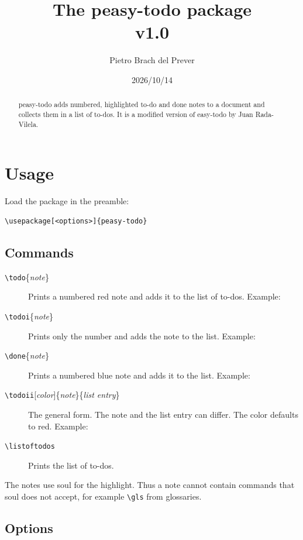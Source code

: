 \documentclass{article}
\title{The \textsf{peasy-todo} package\\\large v1.0}
\author{Pietro Brach del Prever}
\date{2026/10/14}
\newcommand{\cs}[1]{\texttt{\textbackslash#1}}
\begin{document}
\maketitle

\begin{abstract}
  \textsf{peasy-todo} adds numbered, highlighted to-do and done notes to a document
  and collects them in a list of to-dos. It is a modified version of
  \textsf{easy-todo} by Juan Rada-Vilela.
\end{abstract}

\listoftodos

\section{Usage}

Load the package in the preamble:
\begin{verbatim}
\usepackage[<options>]{peasy-todo}
\end{verbatim}

\subsection{Commands}

\begin{description}
  \item[\cs{todo}\{\textit{note}\}] Prints a numbered red note and adds it to the
    list of to-dos. Example: 
  \item[\cs{todoi}\{\textit{note}\}] Prints only the number and adds the note to the
    list. Example: 
  \item[\cs{done}\{\textit{note}\}] Prints a numbered blue note and adds it to the
    list. Example: 
  \item[\cs{todoii}{[\textit{color}]}\{\textit{note}\}\{\textit{list entry}\}] The
    general form. The note and the list entry can differ. The color defaults to red.
    Example: 
  \item[\cs{listoftodos}] Prints the list of to-dos.
\end{description}

The notes use \textsf{soul} for the highlight. Thus a note cannot contain commands
that \textsf{soul} does not accept, for example \cs{gls} from \textsf{glossaries}.

\subsection{Options}
\end{document}

